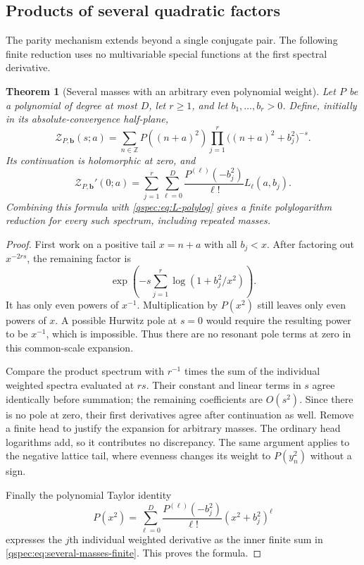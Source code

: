 \documentclass[11pt,letterpaper]{article}
\numberwithin{equation}{section}
\newtheorem{theorem}{Theorem}[section]
\theoremstyle{definition}
\newcommand{\Z}{\mathbb Z}
\begin{document}
\subsection{Products of several quadratic factors}
The parity mechanism extends beyond a single conjugate pair. The following
finite reduction uses no multivariable special functions at the first
spectral derivative.

\begin{theorem}[Several masses with an arbitrary even polynomial weight]
\label{qspec:thm:several-masses}
Let $P$ be a polynomial of degree at most $D$, let $r\ge1$, and let
$b_1,\ldots,b_r>0$. Define, initially in its absolute-convergence
half-plane,
\begin{equation}\label{qspec:eq:several-masses}
\mathcal Z_{P,\mathbf b}(s;a)=
\sum_{n\in\Z}P((n+a)^2)
\prod_{j=1}^r\bigl((n+a)^2+b_j^2\bigr)^{-s}.
\end{equation}
Its continuation is holomorphic at zero, and
\begin{equation}\label{qspec:eq:several-masses-finite}
\mathcal Z_{P,\mathbf b}'(0;a)
=\sum_{j=1}^r\sum_{\ell=0}^D
\frac{P^{(\ell)}(-b_j^2)}{\ell!}L_\ell(a,b_j).
\end{equation}
Combining this formula with \eqref{qspec:eq:L-polylog} gives a finite
polylogarithm reduction for every such spectrum, including repeated masses.
\end{theorem}
\begin{proof}
First work on a positive tail $x=n+a$ with all $b_j<x$. After factoring
out $x^{-2rs}$, the remaining factor is
\[
\exp\left(-s\sum_{j=1}^r\log(1+b_j^2/x^2)\right).
\]
It has only even powers of $x^{-1}$. Multiplication by $P(x^2)$ still
leaves only even powers of $x$. A possible Hurwitz pole at $s=0$
would require the resulting power to be $x^{-1}$, which is impossible.
Thus there are no resonant pole terms at zero in this common-scale
expansion.

Compare the product spectrum with $r^{-1}$ times the sum of the
individual weighted spectra evaluated at $rs$. Their constant and
linear terms in $s$ agree identically before summation; the remaining
coefficients are $O(s^2)$. Since there is no pole at zero, their first
derivatives agree after continuation as well. Remove a finite head
to justify the expansion for arbitrary masses. The ordinary head
logarithms add, so it contributes no discrepancy. The same argument
applies to the negative lattice tail, where evenness changes its
weight to $P(y_n^2)$ without a sign.

Finally the polynomial Taylor identity
\[
P(x^2)=\sum_{\ell=0}^D\frac{P^{(\ell)}(-b_j^2)}{\ell!}
 (x^2+b_j^2)^\ell
\]
expresses the $j$th individual weighted derivative as the inner finite
sum in \eqref{qspec:eq:several-masses-finite}. This proves the formula.
\end{proof}
\end{document}
